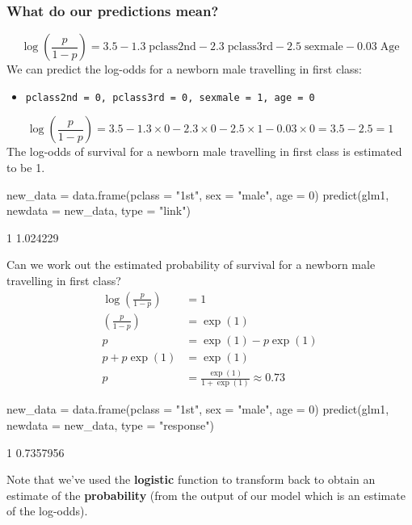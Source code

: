 \documentclass[a4paper]{article}\usepackage[]{graphicx}\usepackage[]{xcolor}
\begin{document}
\subsubsection{What do our predictions mean?}
\[
	\log\left(\frac{p}{1-p}\right) = 3.5 - 1.3\;\text{pclass2nd} - 2.3\;\text{pclass3rd} - 2.5\;\text{sexmale} - 0.03\;\text{Age}
\]
We can predict the log-odds for a newborn male travelling in first class:
\begin{itemize}
	\item \lstinline|pclass2nd = 0, pclass3rd = 0, sexmale = 1, age = 0|
\end{itemize}
\[
	\log\left(\frac{p}{1-p}\right) = 3.5 - 1.3\times 0 - 2.3\times 0 - 2.5\times 1 - 0.03\times 0 = 3.5 - 2.5 = 1
\]
The log-odds of survival for a newborn male travelling in first class is estimated to be 1.
\begin{Schunk}
\begin{Sinput}
new_data = data.frame(pclass = "1st", sex = "male", age = 0)
predict(glm1, newdata = new_data, type = "link")
\end{Sinput}
\begin{Soutput}
       1 
1.024229 
\end{Soutput}
\end{Schunk}
Can we work out the estimated probability of survival for a newborn male travelling in first class?
\begin{align*}
	\log\left(\frac{p}{1-p}\right) & = 1 \\
	\left(\frac{p}{1-p}\right) & = \exp(1) \\
	p & = \exp(1) - p\exp(1) \\
	p + p\exp(1) & = \exp(1) \\
	p & = \frac{\exp(1)}{1+\exp(1)} \approx 0.73
\end{align*}
\begin{Schunk}
\begin{Sinput}
new_data = data.frame(pclass = "1st", sex = "male", age = 0)
predict(glm1, newdata = new_data, type = "response")
\end{Sinput}
\begin{Soutput}
        1 
0.7357956 
\end{Soutput}
\end{Schunk}
Note that we've used the \textcolor{myred}{\textbf{logistic}} function to transform back to obtain an estimate of the \textbf{probability} (from the output of our model which is an estimate of the log-odds).
\end{document}
